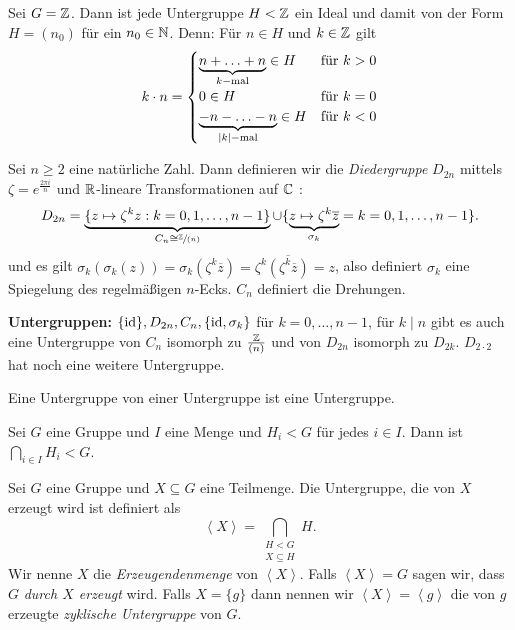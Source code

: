 \begin{eg}
	Sei $G = \mathbb{Z}$. Dann ist jede Untergruppe $H < \mathbb{Z}$ ein Ideal und damit von der Form $H = (n_0)$ für ein $n_0 \in \mathbb{N}$.
	Denn: Für $n \in H$ und $k \in \mathbb{Z}$ gilt 
	\[
		k \cdot n = \begin{cases}
			\underbrace{n + \ldots + n}_{k-\text{mal}} \in H &\text{für } k > 0\\
			0 \in H &\text{für } k = 0\\
			\underbrace{-n - \ldots -n}_{\abs{k}-\text{mal}} \in H &\text{für } k <0
		\end{cases}
	\]
\end{eg}

\begin{eg}
	Sei $n \geq 2$ eine natürliche Zahl.
	Dann definieren wir die \emph{Diedergruppe} $D_{2n}$ mittels $\zeta = e^{\frac{2 \pi i}{n}}$ und $\mathbb{R}$-lineare Transformationen auf $\mathbb{C}$ :
	\[
		D_{2n} = \underbrace{\{z \mapsto \zeta^{k} z : k = 0,1,\ldots,n-1\}}_{C_{n} \cong \sfrac{\mathbb{Z}}{(n)}} \cup 
		\{\underbrace{z \mapsto \zeta^{k} \overline{z}}_{\sigma_{k}} = k = 0,1,\ldots,n-1\} 
	.\] 
	und es gilt $\sigma_{k}(\sigma_{k}(z)) = \sigma_{k}(\zeta^{k} \overline{z}) = \zeta^{k} \overline{(\zeta^{k} \overline{z})} = z$, also definiert $\sigma_{k}$ eine Spiegelung 
	des regelmäßigen $n$-Ecks. $C_{n}$ definiert die Drehungen.

	\textbf{Untergruppen:} $\{\operatorname{id}\}, D_{2n}, C_{n}, \{\operatorname{id}, \sigma_{k}\}$ für $k = 0,\ldots,n-1$, für $k \mid n$ gibt es auch eine Untergruppe von $C_{n}$ isomorph zu $\frac{\mathbb{Z}}{(n)}$ 
	und von $D_{2n}$ isomorph zu $D_{2k}$. $D_{2\cdot 2}$ hat noch eine weitere Untergruppe.
\end{eg}

\begin{lemma}
	Eine Untergruppe von einer Untergruppe ist eine Untergruppe.
\end{lemma}

\begin{lemma}
	Sei $G$ eine Gruppe und $I$ eine Menge und $H_{i} < G$ für jedes $i \in I$.
	Dann ist $\bigcap_{i \in I} H_{i} < G$.
\end{lemma}

\begin{definition}
	Sei $G$ eine Gruppe und $X \subseteq G$ eine Teilmenge. Die Untergruppe, die von $X$ erzeugt wird ist definiert als
	\[
		\left< X \right> = \bigcap_{\substack{H < G\\ X \subseteq H}} H
	.\] 
	Wir nenne  $X$ die \emph{Erzeugendenmenge} von $\left< X \right>$. Falls $\left< X \right> = G$ sagen wir, dass $G$ \emph{durch $X$ erzeugt} wird.
	Falls $X = \{g\}$ dann nennen wir $\left< X \right> = \left< g \right>$ die von $g$ erzeugte \emph{zyklische Untergruppe} von $G$. 
\end{definition}

